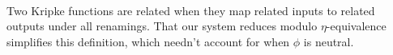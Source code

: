 \documentclass[sigplan,screen]{acmart}
\begin{document}
\begin{AgdaAlign}
\begin{code}
\AgdaSymbol{\{}\AgdaSpace{}%
\AgdaSymbol{=}\AgdaSpace{}%
\AgdaSymbol{\}}\AgdaSpace{}%
\AgdaSpace{}%
\AgdaSpace{}%
\AgdaSymbol{=}\AgdaSpace{}%
\AgdaSpace{}%
\AgdaSpace{}%
\AgdaSpace{}%
\<%
\\
%
\>[2]\AgdaSpace{}%
\AgdaSymbol{\{}\AgdaSpace{}%
\AgdaSymbol{=}\AgdaSpace{}%
\AgdaSymbol{\}}\AgdaSpace{}%
\AgdaSpace{}%
\AgdaSpace{}%
\AgdaSymbol{=}\AgdaSpace{}%
\AgdaSpace{}%
\AgdaSpace{}%
\AgdaSpace{}%
\<%
\end{code}
\end{AgdaAlign}

\Ni Two Kripke functions are related when they map related inputs to related outputs under all renamings. That our system reduces modulo $\eta$-equivalence simplifies this definition, which needn't account for when $\phi$ is neutral.
\end{document}
